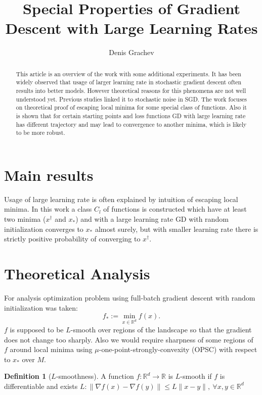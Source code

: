 \documentclass{article}
\title{Special Properties of Gradient Descent with Large Learning Rates}
\author{Denis Grachev}
\theoremstyle{definition}
\newtheorem{definition}{Definition}[section]
\begin{document}
\maketitle

\begin{abstract}
This article is an overview of the work \cite{mohtashami2023special}
with some additional experiments. 
It has been widely observed that usage of larger learning 
rate in stochastic gradient descent often results into better models.
However theoretical reasons for this phenomena are not well understood yet.
Previous studies linked it to stochastic noise in SGD. 
The work focuses on theoretical proof of escaping local minima 
for some special class of functions. 
Also it is shown that for certain starting points and loss functions
GD with large learning rate has different trajectory 
and may lead to convergence to another minima, 
which is likely to be more robust. 

\end{abstract}


\section{Main results}
Usage of large learning rate is often explained by intuition of 
escaping local minima. 
In this work a class $C_l$ of functions is constructed 
which have at least two minima ($x^\dagger$ and $x_\ast$) and 
with a large learning rate GD with random initialization converges 
to $x_\ast$ almost surely, but with smaller learning rate 
there is strictly positive probability of converging to $x^\dagger$.

\section{Theoretical Analysis}
For analysis optimization problem using full-batch
gradient descent with random initialization was taken:
$$ f_* := \min_{x \in \mathbb{R}^d} f(x).$$
$f$ is supposed to be $L$-smooth over regions of the landscape 
so that the gradient does not change too sharply. 
Also we would require sharpness of some regions of $f$ 
around local minima using 
$\mu$-one-point-strongly-convexity (OPSC) with respect to $x_\ast$ over $M$.

\begin{definition}[$L$-smoothness]
    A function $f: \mathbb{R}^d \rightarrow \mathbb{R}$ 
    is $L$-smooth if $f$ is differentiable and 
    exists $L: \| \nabla f(x) - \nabla f(y)\| \leq L \| x - y \|, \: \forall x, y \in \mathbb{R}^d$ 
\end{definition}
\end{document}
